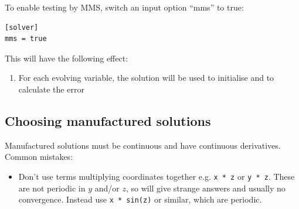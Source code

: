 \documentclass[12pt]{article}
\begin{document}
To enable testing by MMS, switch an input option ``mms'' to true:
%
\begin{lstlisting}
[solver]
mms = true
\end{lstlisting}
%
This will have the following effect:
%
\begin{enumerate}
\item For each evolving variable, the solution will be used to initialise and
    to calculate the error
\end{enumerate}
%



\subsection{Choosing manufactured solutions}
%
Manufactured solutions must be continuous and have continuous derivatives.
Common mistakes:
%
\begin{itemize}
\item Don't use terms multiplying coordinates together e.g. \texttt{x * z} or
    \texttt{y * z}. These are not periodic in $y$ and/or $z$, so will give
    strange answers and usually no convergence. Instead use \texttt{x * sin(z)}
    or similar, which are periodic.
\end{itemize}
%
\end{document}
